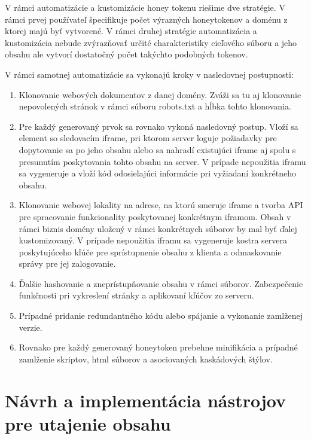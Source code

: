 \documentclass[conference, 11pt,slovak,a4paper,twoside]{IEEEtran}
\begin{document}
V rámci automatizácie a kustomizácie honey tokenu riešime dve stratégie. V rámci prvej používateľ špecifikuje počet výrazných honeytokenov a doménu z ktorej majú byť vytvorené. V rámci druhej stratégie automatizácia a kustomizácia nebude zvýrazňovať určité charakteristiky cieľového súboru a jeho obsahu ale vytvorí dostatočný počet takýchto podobných tokenov.

V rámci samotnej automatizácie sa vykonajú kroky v nasledovnej postupnosti:
\begin{enumerate}
	\item Klonovanie webových dokumentov z danej domény. Zváži sa tu aj klonovanie nepovolených stránok v rámci súboru robots.txt a hĺbka tohto klonovania.

	\item Pre každý generovaný prvok sa rovnako vykoná nasledovný postup. Vloží sa element so sledovacím iframe, pri ktorom server loguje požiadavky pre dopytovanie sa po jeho obsahu alebo sa nahradí existujúci iframe aj spolu s presunutím poskytovania tohto obsahu na server. V prípade nepoužitia iframu sa vygeneruje a vloží kód odosielajúci informácie pri vyžiadaní konkrétneho obsahu.
	
	\item Klonovanie webovej lokality na adrese, na ktorú smeruje iframe a tvorba API pre spracovanie funkcionality poskytovanej konkrétnym iframom. Obsah v rámci biznis domény uložený v rámci konkrétnych súborov by mal byť ďalej kustomizovaný. V prípade nepoužitia iframu sa vygeneruje kostra servera poskytujúceho kľúče pre sprístupnenie obsahu z klienta a odmaskovanie správy pre jej zalogovanie.
	
	\item Ďalšie hashovanie a zneprístupňovanie obsahu v rámci súborov. Zabezpečenie funkčnosti pri vykreslení stránky a aplikovaní kľúčov zo serveru.
	
	\item Prípadné pridanie redundantného kódu alebo spájanie a vykonanie zamlženej verzie.
	
	\item Rovnako pre každý generovaný honeytoken prebehne minifikácia a prípadné zamlženie skriptov, html súborov a asociovaných kaskádových štýlov. 
\end{enumerate}


\section{Návrh a implementácia nástrojov pre utajenie obsahu}
\end{document}
